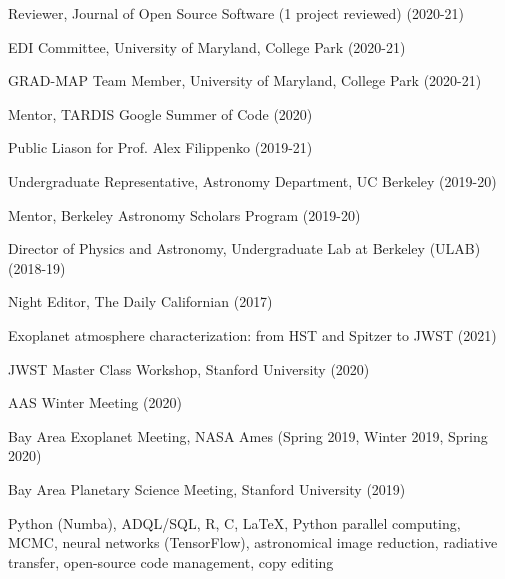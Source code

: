 \documentclass[12pt,letterpaper]{article}
\begin{document}
\begin{list}{}{\cvlist}
\item Reviewer, Journal of Open Source Software (1 project reviewed) (2020-21)
\item EDI Committee, University of Maryland, College Park (2020-21)
\item GRAD-MAP Team Member, University of Maryland, College Park (2020-21)
\item Mentor, TARDIS Google Summer of Code (2020)
\item Public Liason for Prof. Alex Filippenko (2019-21)
\item Undergraduate Representative, Astronomy Department, UC Berkeley (2019-20)
\item Mentor, Berkeley Astronomy Scholars Program (2019-20)
\item Director of Physics and Astronomy, Undergraduate Lab at Berkeley (ULAB) (2018-19)
\item Night Editor, The Daily Californian (2017)
\end{list}

\begin{list}{}{\cvlist}
\item Exoplanet atmosphere characterization: from HST and Spitzer to JWST (2021)
\item JWST Master Class Workshop, Stanford University (2020)
\item AAS Winter Meeting (2020)
\item Bay Area Exoplanet Meeting, NASA Ames (Spring 2019, Winter 2019, Spring 2020)
\item Bay Area Planetary Science Meeting, Stanford University (2019)
\end{list}

\begin{list}{}{\cvlist}
\item Python (Numba), ADQL/SQL, R, C, \LaTeX, Python parallel computing, MCMC, neural networks (TensorFlow), astronomical image reduction, radiative transfer, open-source code management, copy editing
\end{list}
\end{document}
